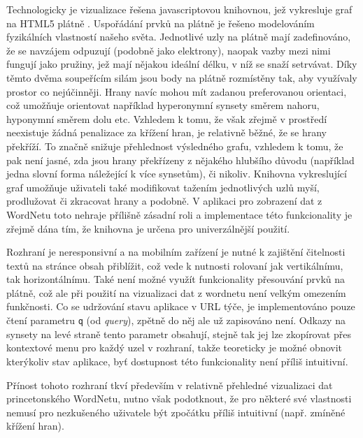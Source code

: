 \documentclass[a4paper, 11pt, oneside]{book}
\begin{document}
				Technologicky je vizualizace řešena javascriptovou knihovnou, jež vykresluje graf na HTML5 plátně \parencite{w3schools2017htmlcanvas}. Uspořádání prvků na plátně je řešeno modelováním fyzikálních vlastností našeho světa. Jednotlivé uzly na plátně mají zadefinováno, že se navzájem odpuzují (podobně jako elektrony), naopak vazby mezi nimi fungují jako pružiny, jež mají nějakou ideální délku, v níž se snaží setrvávat. Díky těmto dvěma soupeřícím silám jsou body na plátně rozmístěny tak, aby využívaly prostor co nejúčinněji. Hrany navíc mohou mít zadanou preferovanou orientaci, což umožňuje orientovat například hyperonymní synsety směrem nahoru, hyponymní směrem dolu etc. \parencite{wordvis2010vercruysse} Vzhledem k tomu, že však zřejmě v prostředí neexistuje žádná penalizace za křížení hran, je relativně běžné, že se hrany překříží. To značně snižuje přehlednost výsledného grafu, vzhledem k tomu, že pak není jasné, zda jsou hrany překřízeny z nějakého hlubšího důvodu (například jedna slovní forma náležející k více synsetům), či nikoliv. Knihovna vykreslující graf umožňuje uživateli také modifikovat tažením jednotlivých uzlů myší, prodlužovat či zkracovat hrany a podobně. V aplikaci pro zobrazení dat z WordNetu toto nehraje přílišně zásadní roli a implementace této funkcionality je zřejmě dána tím, že knihovna je určena pro univerzálnější použití. \parencite{wordvis2010vercruysse}

				Rozhraní je neresponsivní a na mobilním zařízení je nutné k zajištění čitelnosti textů na stránce obsah přiblížit, což vede k nutnosti rolovaní jak vertikálnímu, tak horizontálnímu. Také není možné využít funkcionality přesouvání prvků na plátně, což ale při použití na vizualizaci dat z wordnetu není velkým omezením funkčnosti. Co se udržování stavu aplikace v URL týče, je implementováno pouze čtení parametru {\tt q} (od \textit{query}), zpětně do něj ale už zapisováno není. Odkazy na synsety na levé straně tento parametr obsahují, stejně tak jej lze zkopírovat přes kontextové menu pro každý uzel v rozhraní, takže teoreticky je možné obnovit kterýkoliv stav aplikace, byť dostupnost této funkcionality není příliš intuitivní.

				Přínost tohoto rozhraní tkví především v relativně přehledné vizualizaci dat princetonského WordNetu, nutno však podotknout, že pro některé své vlastnosti nemusí pro nezkušeného uživatele být zpočátku příliš intuitivní (např. zmíněné křížení hran).



 
	\printbibliography[title={Seznam literatury}]

\end{document}
